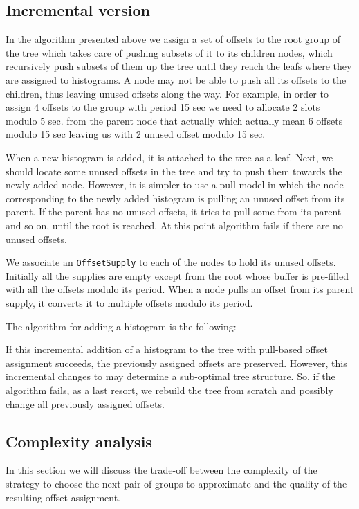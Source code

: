 \subsection{Incremental version}

In the algorithm presented above we assign a set of offsets to the root group of the tree which takes care of pushing subsets of it to its children nodes, which recursively push subsets of them up the tree until they reach the leafs where they are assigned to histograms. A node may not be able to push all its offsets to the children, thus leaving unused offsets along the way. For example, in order to assign 4 offsets to the group with period 15 sec we need to allocate 2 slots modulo 5 sec. from the parent node that actually which actually mean 6 offsets modulo 15 sec leaving us with 2 unused offset modulo 15 sec.

When a new histogram is added, it is attached to the tree as a leaf. Next, we should locate some unused offsets in the tree and try to push them towards the newly added node. However, it is simpler to use a pull model in which the node corresponding to the newly added histogram is pulling an unused offset from its parent. If the parent has no unused offsets, it tries to pull some from its parent and so on, until the root is reached. At this point algorithm fails if there are no unused offsets.

We associate an {\tt OffsetSupply} to each of the nodes to hold its unused offsets. Initially all the supplies are empty except from the root whose buffer is pre-filled with all the offsets modulo its period. When a node pulls an offset from its parent supply, it converts it to multiple offsets modulo its period.

The algorithm for adding a histogram is the following:

If this incremental addition of a histogram to the tree with pull-based offset assignment succeeds, the previously assigned offsets are preserved. However, this incremental changes to may determine a sub-optimal tree structure. So, if the algorithm fails, as a last resort, we rebuild the tree from scratch and possibly change all previously assigned offsets.

\subsection{Complexity analysis}

In this section we will discuss the trade-off between the complexity of the strategy to choose the next pair of groups to approximate and the quality of the resulting offset assignment.


